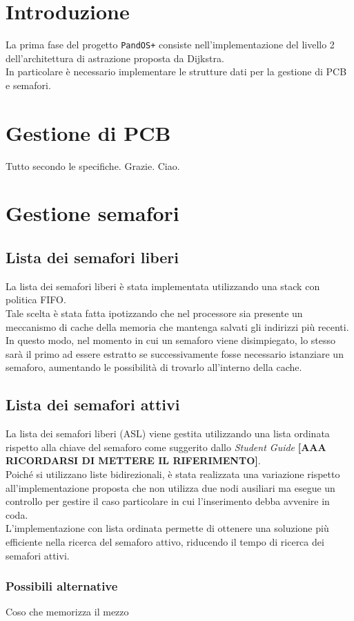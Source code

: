 \documentclass[11pt]{article}
\begin{document}
\newpage

\section{Introduzione}
La prima fase del progetto \texttt{PandOS+} consiste nell'implementazione del livello 2 dell'architettura di astrazione proposta da Dijkstra.\\
In particolare è necessario implementare le strutture dati per la gestione di PCB e semafori.

\section{Gestione di PCB}
Tutto secondo le specifiche. Grazie. Ciao.

\section{Gestione semafori}
\subsection{Lista dei semafori liberi}
La lista dei semafori liberi è stata implementata utilizzando una stack con politica FIFO. \\
Tale scelta è stata fatta ipotizzando che nel processore sia presente un meccanismo di cache della memoria che mantenga salvati gli indirizzi più recenti. 
In questo modo, nel momento in cui un semaforo viene disimpiegato, 
lo stesso sarà il primo ad essere estratto se successivamente fosse necessario istanziare un semaforo, aumentando le possibilità di trovarlo all'interno della cache.

\subsection{Lista dei semafori attivi}
La lista dei semafori liberi (ASL) viene gestita utilizzando una lista ordinata rispetto alla chiave del semaforo come suggerito dallo \textit{Student Guide} \textbf{[AAA RICORDARSI DI METTERE IL RIFERIMENTO]}. \\
Poiché si utilizzano liste bidirezionali, è stata realizzata una variazione rispetto all'implementazione proposta che non utilizza due nodi ausiliari ma 
esegue un controllo per gestire il caso particolare in cui l'inserimento debba avvenire in coda.\\
L'implementazione con lista ordinata permette di ottenere una soluzione più efficiente nella ricerca del semaforo attivo, riducendo il tempo di ricerca dei semafori attivi.
\subsubsection{Possibili alternative}
Coso che memorizza il mezzo

\newpage
\printbibliography[title={Bibliografia}]
\end{document}
